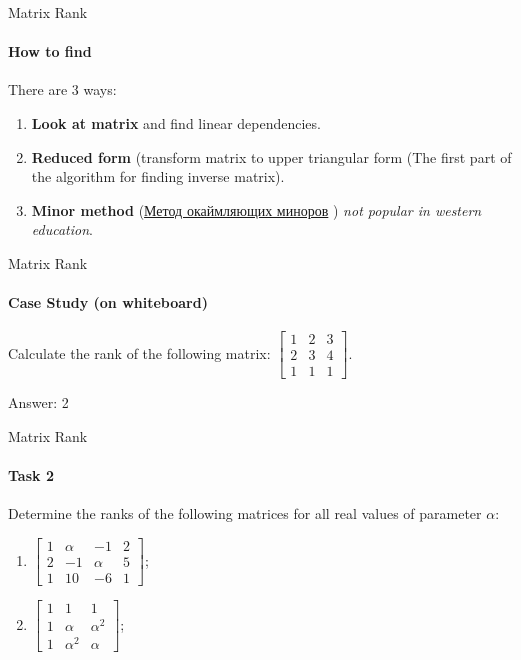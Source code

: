\documentclass[aspectratio=169]{beamer}
\begin{document}
    \begin{frame}[t]{Matrix Rank}
    \framesubtitle{How to find}
        There are 3 ways:
        \begin{enumerate}
            \item \textbf{Look at matrix} and find linear dependencies.
            \item \textbf{Reduced form} (transform matrix to upper triangular form (The first part of the algorithm for finding inverse matrix).
            \item \textbf{Minor method} (\href{http://www.mathprofi.ru/rang_matricy.html}{Метод окаймляющих миноров} ) \textit{not popular in western education}.
        \end{enumerate}
    \end{frame}


\begin{frame}[t]{Matrix Rank}
\framesubtitle{Case Study (on whiteboard)}
Calculate the rank of the following matrix: $\begin{bmatrix}1&2&3\\2&3&4\\1&1&1\end{bmatrix}$. \medskip

\alert{\Large Answer: 2}
\end{frame}

\begin{frame}[t]{Matrix Rank}
\framesubtitle{Task 2}
Determine the ranks of the following matrices for all real values of parameter $\alpha$:
\begin{enumerate}

    \item $\begin{bmatrix}1&\alpha&-1&2\\2&-1&\alpha&5\\1&10&-6&1\end{bmatrix}$;
    \item $\begin{bmatrix}1&1&1\\1&\alpha&\alpha^2\\1&\alpha^2&\alpha\end{bmatrix}$;
\end{enumerate}
\end{frame}
\end{document}
